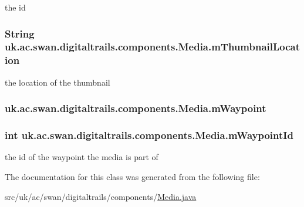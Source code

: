 the id 

\hypertarget{classuk_1_1ac_1_1swan_1_1digitaltrails_1_1components_1_1_media_a50f6550300077e923c98c13bc892a14f}{
\subsubsection[{m\+Thumbnail\+Location}]{\setlength{\rightskip}{0pt plus 5cm}String uk.\+ac.\+swan.\+digitaltrails.\+components.\+Media.\+m\+Thumbnail\+Location\hspace{0.3cm}{\ttfamily [protected]}}}\label{classuk_1_1ac_1_1swan_1_1digitaltrails_1_1components_1_1_media_a50f6550300077e923c98c13bc892a14f}


the location of the thumbnail 

\hypertarget{classuk_1_1ac_1_1swan_1_1digitaltrails_1_1components_1_1_media_a0ea3d744cb900324ba748a2c7604dc19}{
\subsubsection[{m\+Waypoint}]{ uk.\+ac.\+swan.\+digitaltrails.\+components.\+Media.\+m\+Waypoint\hspace{0.3cm}{\ttfamily [protected]}}}\label{classuk_1_1ac_1_1swan_1_1digitaltrails_1_1components_1_1_media_a0ea3d744cb900324ba748a2c7604dc19}
\hypertarget{classuk_1_1ac_1_1swan_1_1digitaltrails_1_1components_1_1_media_a4c8b01f28e5c33695b745849f3c72dc4}{
\subsubsection[{m\+Waypoint\+Id}]{\setlength{\rightskip}{0pt plus 5cm}int uk.\+ac.\+swan.\+digitaltrails.\+components.\+Media.\+m\+Waypoint\+Id\hspace{0.3cm}{\ttfamily [protected]}}}\label{classuk_1_1ac_1_1swan_1_1digitaltrails_1_1components_1_1_media_a4c8b01f28e5c33695b745849f3c72dc4}


the id of the waypoint the media is part of 



The documentation for this class was generated from the following file\+:\begin{DoxyCompactItemize}
\item 
src/uk/ac/swan/digitaltrails/components/\hyperlink{_media_8java}{Media.\+java}\end{DoxyCompactItemize}
